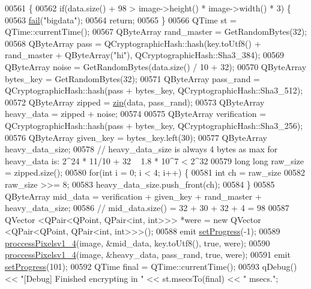 \begin{DoxyCode}
00561 \{
00562     \textcolor{keywordflow}{if}(data.size() + 98 > image->height() * image->width() * 3) \{
00563         \hyperlink{class_model_p_c_a47464b59b7e37fcee25e55475708aabd}{fail}(\textcolor{stringliteral}{"bigdata"});
00564         \textcolor{keywordflow}{return};
00565     \}
00566     QTime st = QTime::currentTime();
00567     QByteArray rand\_master = GetRandomBytes(32);
00568     QByteArray pass = QCryptographicHash::hash(key.toUtf8() + rand\_master + QByteArray(\textcolor{stringliteral}{"hi"}), 
      QCryptographicHash::Sha3\_384);
00569     QByteArray noise = GetRandomBytes(data.size() / 10 + 32);
00570     QByteArray bytes\_key = GetRandomBytes(32);
00571     QByteArray pass\_rand = QCryptographicHash::hash(pass + bytes\_key, QCryptographicHash::Sha3\_512);
00572     QByteArray zipped = \hyperlink{class_model_p_c_afebbbfa4b07deba4f68fc6dfb50f353f}{zip}(data, pass\_rand);
00573     QByteArray heavy\_data = zipped + noise;
00574 
00575     QByteArray verification = QCryptographicHash::hash(pass + bytes\_key, QCryptographicHash::Sha3\_256);
00576     QByteArray given\_key = bytes\_key.left(30);
00577     QByteArray heavy\_data\_size;
00578     \textcolor{comment}{// heavy\_data\_size is always 4 bytes as max for heavy\_data is: 2^24 * 11/10 + 32 ~ 1.8 * 10^7 < 2^32}
00579     \textcolor{keywordtype}{long} \textcolor{keywordtype}{long} raw\_size = zipped.size();
00580     \textcolor{keywordflow}{for}(\textcolor{keywordtype}{int} i = 0; i < 4; i++) \{
00581         \textcolor{keywordtype}{int} ch = raw\_size %
00582         raw\_size >>= 8;
00583         heavy\_data\_size.push\_front(ch);
00584     \}
00585     QByteArray mid\_data = verification + given\_key + rand\_master + heavy\_data\_size;
00586     \textcolor{comment}{// mid\_data.size() = 32 + 30 + 32 + 4 = 98}
00587     QVector <QPair<QPoint, QPair<int, int>>> *were = \textcolor{keyword}{new} QVector <QPair<QPoint, QPair<int, int>>>();
00588     emit \hyperlink{class_model_p_c_afdcd80f0ed5062e145a71f09b0897547}{setProgress}(-1);
00589     \hyperlink{class_model_p_c_a5cdb4d1d61ff62ee9d45b496a7dbf1fb}{proccessPixelsv1\_4}(image, &mid\_data, key.toUtf8(), \textcolor{keyword}{true}, were);
00590     \hyperlink{class_model_p_c_a5cdb4d1d61ff62ee9d45b496a7dbf1fb}{proccessPixelsv1\_4}(image, &heavy\_data, pass\_rand, \textcolor{keyword}{true}, were);
00591     emit \hyperlink{class_model_p_c_afdcd80f0ed5062e145a71f09b0897547}{setProgress}(101);
00592     QTime \textcolor{keyword}{final} = QTime::currentTime();
00593     qDebug() << \textcolor{stringliteral}{"[Debug] Finished encrypting in "} << st.msecsTo(\textcolor{keyword}{final}) << \textcolor{stringliteral}{" msecs."};

\end{DoxyCode}
